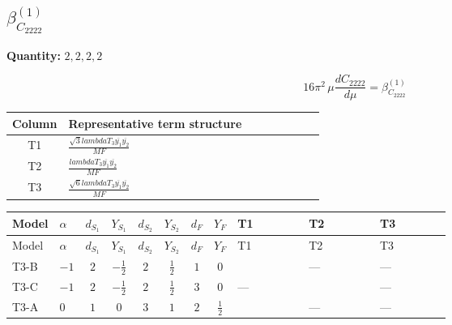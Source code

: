 \documentclass[8pt]{article}
\begin{document}
\begin{landscape}
\section*{$\beta_{C_{2222}}^{(1)}$}
\noindent\textbf{Quantity: }$\mathrm{2,2,2,2}$\par\smallskip
\[16\pi^2\,\mu\frac{d C_{2222}}{d\mu}=\beta_{C_{2222}}^{(1)}\]
\begin{center}
\begin{tabular}{@{}c >{\raggedright\arraybackslash}p{0.82\linewidth}@{}}
\toprule
Column & Representative term structure \\
\midrule
T1 & \(\displaystyle \frac{\sqrt{3} lambdaT_{3} \overline{y_{1}} \overline{y_{2}}}{MF}\) \\
\midrule
T2 & \(\displaystyle \frac{lambdaT_{3} \overline{y_{1}} \overline{y_{2}}}{MF}\) \\
\midrule
T3 & \(\displaystyle \frac{\sqrt{6} lambdaT_{3} \overline{y_{1}} \overline{y_{2}}}{MF}\) \\
\midrule
\bottomrule
\end{tabular}
\end{center}
\smallskip
\tiny
\begin{longtable}{@{}llcccccc >{\raggedright\arraybackslash}p{0.21\linewidth} >{\raggedright\arraybackslash}p{0.21\linewidth} >{\raggedright\arraybackslash}p{0.21\linewidth}@{}}
\toprule
Model & $\alpha$ & $d_{S_1}$ & $Y_{S_1}$ & $d_{S_2}$ & $Y_{S_2}$ & $d_F$ & $Y_F$ & T1 & T2 & T3 \\
\midrule
\endfirsthead
\toprule
Model & $\alpha$ & $d_{S_1}$ & $Y_{S_1}$ & $d_{S_2}$ & $Y_{S_2}$ & $d_F$ & $Y_F$ & T1 & T2 & T3 \\
\midrule
\endhead
T3-B & $-1$ & $2$ & $-\frac{1}{2}$ & $2$ & $\frac{1}{2}$ & $1$ & $0$ & \scriptsize\adjustbox{max width=\linewidth}{$\begin{gathered} - \frac{2 \sqrt{3} lambdaT_{3} \overline{y_{1}} \overline{y_{2}}}{3 MF}\end{gathered}$} & --- & --- \\
\midrule
T3-C & $-1$ & $2$ & $-\frac{1}{2}$ & $2$ & $\frac{1}{2}$ & $3$ & $0$ & --- & \scriptsize\adjustbox{max width=\linewidth}{$\begin{gathered} \frac{2 lambdaT_{3} \overline{y_{1}} \overline{y_{2}}}{3 MF}\end{gathered}$} & --- \\
\midrule
T3-A & $0$ & $1$ & $0$ & $3$ & $1$ & $2$ & $\frac{1}{2}$ & \scriptsize\adjustbox{max width=\linewidth}{$\begin{gathered} - \frac{2 \sqrt{3} lambdaT_{3} \overline{y_{1}} \overline{y_{2}}}{3 MF}\end{gathered}$} & --- & --- \\

\end{longtable}
\end{landscape}
\end{document}

